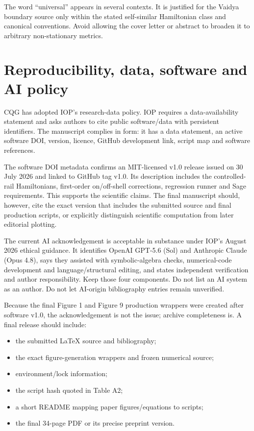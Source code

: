 \documentclass[11pt,a4paper]{article}
\begin{document}
The word ``universal'' appears in several contexts. It is justified for the Vaidya boundary
source only within the stated self-similar Hamiltonian class and canonical conventions. Avoid
allowing the cover letter or abstract to broaden it to arbitrary non-stationary metrics.

\clearpage
\section{Reproducibility, data, software and AI policy}

CQG has adopted IOP's research-data policy. IOP requires a data-availability statement and asks
authors to cite public software/data with persistent identifiers. The manuscript complies in
form: it has a data statement, an active software DOI, version, licence, GitHub development link,
script map and software references.

The software DOI metadata confirms an MIT-licensed v1.0 release issued on 30 July 2026 and linked
to GitHub tag v1.0. Its description includes the controlled-rail Hamiltonians, first-order
on/off-shell corrections, regression runner and Sage requirements. This supports the scientific
claims. The final manuscript should, however, cite the exact version that includes the submitted
source and final production scripts, or explicitly distinguish scientific computation from
later editorial plotting.

The current AI acknowledgement is acceptable in substance under IOP's August 2026 ethical
guidance. It identifies OpenAI GPT-5.6 (Sol) and Anthropic Claude (Opus 4.8), says they assisted
with symbolic-algebra checks, numerical-code development and language/structural editing, and
states independent verification and author responsibility. Keep those four components. Do not
list an AI system as an author. Do not let AI-origin bibliography entries remain unverified.

Because the final Figure 1 and Figure 9 production wrappers were created after software v1.0,
the acknowledgement is not the issue; archive completeness is. A final release should include:
\begin{itemize}
  \item the submitted \LaTeX{} source and bibliography;
  \item the exact figure-generation wrappers and frozen numerical source;
  \item environment/lock information;
  \item the script hash quoted in Table A2;
  \item a short README mapping paper figures/equations to scripts;
  \item the final 34-page PDF or its precise preprint version.
\end{itemize}
\end{document}
